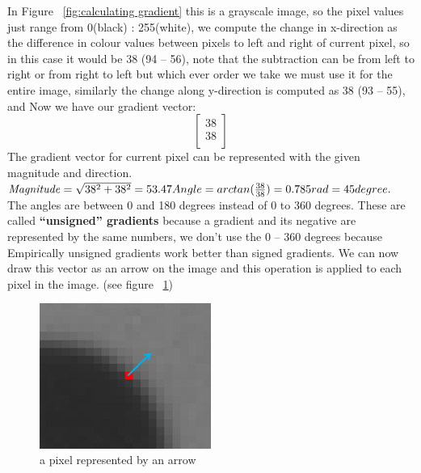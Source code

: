 In Figure ~\ref{fig:calculating gradient} this is a grayscale image, so the pixel values just range from 0(black) : 255(white), we compute the change in x-direction as the difference in colour values between pixels to left and right of current pixel, so in this case it would be 38 (94 – 56), note that the subtraction can be from left to right or from right to left but which ever order we take we must use it for the entire image, similarly the change along y-direction is computed as 38 (93 – 55), and Now we have our gradient vector:
\[ \begin{bmatrix}
38\\
38\\
\end{bmatrix} \]
The gradient vector for current pixel can be represented with the given magnitude and direction.
\newline \newline
\begin{math}
\mathit{Magnitude} = 
\sqrt{38^2 +  38^2} = 53.47 \newline Angle = arctan(\frac{38}{38}) = 0.785 rad = 45 degree.
\end{math}
\newline \newline
The angles are between 0 and 180 degrees instead of 0 to 360 degrees. These are called \textbf{“unsigned” gradients} because a gradient and its negative are represented by the same numbers, we don’t use the 0 – 360 degrees because Empirically unsigned gradients work better than signed gradients.
\newline
We can now draw this vector as an arrow on the image and this operation is applied to each pixel in the image. (see figure ~\ref{fig:pixel representation})

\begin{figure}
	\centering
	\includegraphics[width=0.5\textwidth]{images/gray_scale.png}
	\caption{a pixel represented by an arrow}
	\label{fig:pixel representation}
\end{figure}
